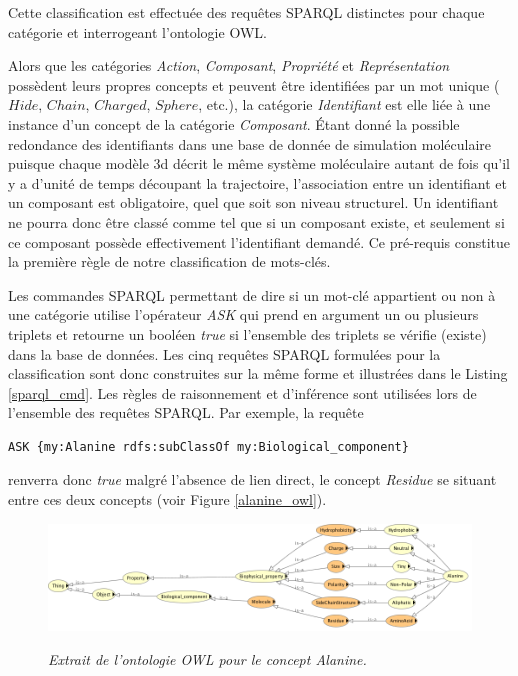 Cette classification est effectuée des requêtes SPARQL distinctes pour chaque catégorie et interrogeant l'ontologie OWL.

Alors que les catégories \textit{Action}, \textit{Composant}, \textit{Propriété} et \textit{Représentation} possèdent leurs propres concepts et peuvent être identifiées par un mot unique ($Hide$, $Chain$, $Charged$, $Sphere$, etc.), la catégorie \textit{Identifiant} est elle liée à une instance d'un concept de la catégorie \textit{Composant}. Étant donné la possible redondance des identifiants dans une base de donnée de simulation moléculaire puisque chaque modèle 3d décrit le même système moléculaire autant de fois qu'il y a d'unité de temps découpant la trajectoire, l'association entre un identifiant et un composant est obligatoire, quel que soit son niveau structurel. Un identifiant ne pourra donc être classé comme tel que si un composant existe, et seulement si ce composant possède effectivement l'identifiant demandé. Ce pré-requis constitue la première règle de notre classification de mots-clés.

Les commandes SPARQL permettant de dire si un mot-clé appartient ou non à une catégorie utilise l'opérateur \textit{ASK} qui prend en argument un ou plusieurs triplets et retourne un booléen \textit{true} si l'ensemble des triplets se vérifie (existe) dans la base de données. Les cinq requêtes SPARQL formulées pour la classification sont donc construites sur la même forme et illustrées dans le Listing \ref{sparql_cmd}. Les règles de raisonnement et d'inférence sont utilisées lors de l'ensemble des requêtes SPARQL. Par exemple, la requête

\begin{lstlisting}[language=XML]
ASK {my:Alanine rdfs:subClassOf my:Biological_component}
\end{lstlisting}

renverra donc \textit{true} malgré l'absence de lien direct, le concept \textit{Residue} se situant entre ces deux concepts (voir Figure \ref{alanine_owl}).

\begin{figure}
  \centering
  {\includegraphics[width=0.8\linewidth]{./figures/ch5/alanine_owl}}
    \caption[Extrait de l'ontologie OWL pour le concept \textit{Alanine}.]{\it Extrait de l'ontologie OWL pour le concept \textit{Alanine}.}
  \label{Fig:alanine_owl}
  \hspace{0.3cm}
\end{figure}

